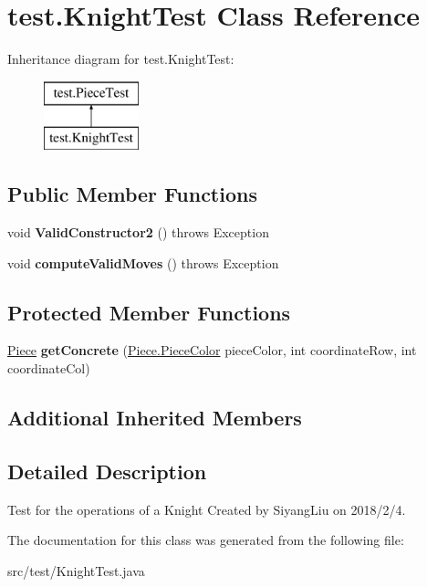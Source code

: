 \hypertarget{classtest_1_1_knight_test}{}\section{test.\+Knight\+Test Class Reference}
\label{classtest_1_1_knight_test}
Inheritance diagram for test.\+Knight\+Test\+:\begin{figure}[H]
\begin{center}
\leavevmode
\includegraphics[height=2.000000cm]{classtest_1_1_knight_test}
\end{center}
\end{figure}
\subsection*{Public Member Functions}
\begin{DoxyCompactItemize}
\item 
\mbox{\label{classtest_1_1_knight_test_ab1a3e2652086c5437ac7c490edd8d5ae}} 
void {\bfseries Valid\+Constructor2} ()  throws Exception 
\item 
\mbox{\label{classtest_1_1_knight_test_a1d8d3a0a9ed74cac83cafcf2779e41e8}} 
void {\bfseries compute\+Valid\+Moves} ()  throws Exception 
\end{DoxyCompactItemize}
\subsection*{Protected Member Functions}
\begin{DoxyCompactItemize}
\item 
\mbox{\label{classtest_1_1_knight_test_ab72a9ecbc9dffaacd38c40bedb7a1347}} 
\mbox{\hyperlink{classpieces_1_1_piece}{Piece}} {\bfseries get\+Concrete} (\mbox{\hyperlink{enumpieces_1_1_piece_1_1_piece_color}{Piece.\+Piece\+Color}} piece\+Color, int coordinate\+Row, int coordinate\+Col)
\end{DoxyCompactItemize}
\subsection*{Additional Inherited Members}


\subsection{Detailed Description}
Test for the operations of a Knight Created by Siyang\+Liu on 2018/2/4. 

The documentation for this class was generated from the following file\+:\begin{DoxyCompactItemize}
\item 
src/test/Knight\+Test.\+java\end{DoxyCompactItemize}
